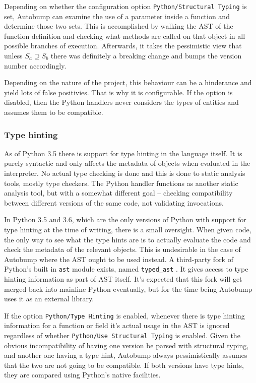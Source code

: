 \documentclass{l4proj}
\newcommand\genericstyle{\lstset{basicstyle=\ttm}}
\newcommand\codeinline[1]{{\genericstyle\lstinline!#1!}}
\begin{document}
Depending on whether the configuration option
\codeinline{Python/Structural Typing} is set, Autobump can examine the use
of a parameter inside a function and determine those two sets. This is
accomplished by walking the AST of the function definition and
checking what methods are called on that object in all possible
branches of execution. Afterwards, it takes the pessimistic view that
unless $S_a \supseteq S_b$ there was definitely a breaking change and
bumps the version number accordingly.

Depending on the nature of the project, this behaviour can be a
hinderance and yield lots of false positivies. That is why it is
configurable. If the option is disabled, then the Python handlers
never considers the types of entities and assumes them to be compatible.

\subsubsection{Type hinting}

As of Python 3.5 there is support for type hinting in the language
itself. It is purely syntactic and only affects the metadata of
objects when evaluated in the interpreter. No actual type checking is
done and this is done to static analysis tools, mostly type checkers.
The Python handler functions as another static analysis tool, but with
a somewhat different goal -- checking compatibility between different
versions of the same code, not validating invocations.

In Python 3.5 and 3.6, which are the only versions of Python with
support for type hinting at the time of writing, there is a small
oversight. When given code, the only way to see what the type hints
are is to actually evaluate the code and check the metadata of the
relevant objects.
This is undesirable in the case of Autobump where the AST ought to be
used instead. A third-party fork of Python's built in \codeinline{ast}
module exists, named \codeinline{typed_ast} \cite{TypedAST}. It gives
access to type hinting information as part of AST itself. It's
expected that this fork will get merged back into mainline Python
eventually, but for the time being Autobump uses it as an external
library.

If the option \codeinline{Python/Type Hinting} is enabled, whenever there
is type hinting information for a function or field it's actual usage
in the AST is ignored regardless of whether \codeinline{Python/Use
Structural Typing} is enabled. Given the obvious incompatibility of
having one version be parsed with structural typing, and another one
having a type hint, Autobump always pessimistically assumes that the two are
not going to be compatible. If both versions have type hints, they are
compared using Python's native facilities.
\end{document}
